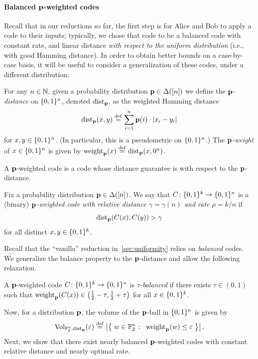\paragraph{Balanced $\p$-weighted codes}
Recall that in our reductions so far, the first step is for Alice and Bob to apply a code to their inputs; typically, we chose that code to be a balanced code with constant rate, and linear distance \emph{with respect to the uniform distribution} (i.e., with good Hamming distance). In order to obtain better bounds on a case-by-case basis, it will be useful to consider a generalization of these codes, under a different distribution:
\begin{definition}[$\p$-distance]
For any $n\in\N$, given a probability distribution $\p\in\distribs{[n]}$ we define the \emph{$\p$-distance} on $\bitset^n$, denoted $\pdistfunc[\p]$, as the weighted Hamming distance
\[
    \pdist[\p]{x}{y} \eqdef \sum_{i=1}^{n} \p(i)\cdot\abs{ x_i - y_i }
\]
for $x,y\in\bitset^n$. (In particular, this is a pseudometric on $\bitset^n$.) The \emph{$\p$-weight} of $x\in\bitset^n$ is given by $\pweight[\p]{x} \eqdef \pdist[\p]{x}{0^n}$.
\end{definition}

A $\p$-weighted code is a code whose distance guarantee is with respect to the $\p$-distance. 
\begin{definition}
Fix a probability distribution $\p\in\distribs{[n]}$. We say that $C\colon\bitset^k\to\bitset^n$ is a (binary) \emph{$\p$-weighted code with relative distance $\gamma=\gamma(n)$ and rate $\rho = k/n$} if \[\pdist[\p]{C(x)}{C(y)} > \gamma\] for all distinct $x,y\in \bitset^k$.
\end{definition}

Recall that the ``vanilla'' reduction in~\cref{sec:uniformity} relies on \emph{balanced} codes. We generalize the balance property to the $\p$-distance and allow the following relaxation.
\begin{definition}
	A $\p$-weighted code $C\colon\bitset^k\to\bitset^n$ is \emph{$\tau$-balanced} if there exists $\tau \in(0,1)$ such that $\pweight[\p]{C(x)}\in\left(\frac{1}{2} -\tau, \frac{1}{2}+\tau\right)$ for all $x\in\bitset^k$.
\end{definition}
Now, for a distribution $\p$, the volume of the $\p$-ball in $\bitset^n$ is given by
\[
 \operatorname{Vol}_{\mathbb{F}_2^n,\pdistfunc[\p]}(\eps) 
    \eqdef \abs{ \setOfSuchThat{w\in \mathbb{F}_2^n }{ \pweight[\p]{w} \leq \eps } }.
\]
Next, we show that there exist nearly balanced $\p$-weighted codes with constant relative distance and nearly optimal rate.
 
